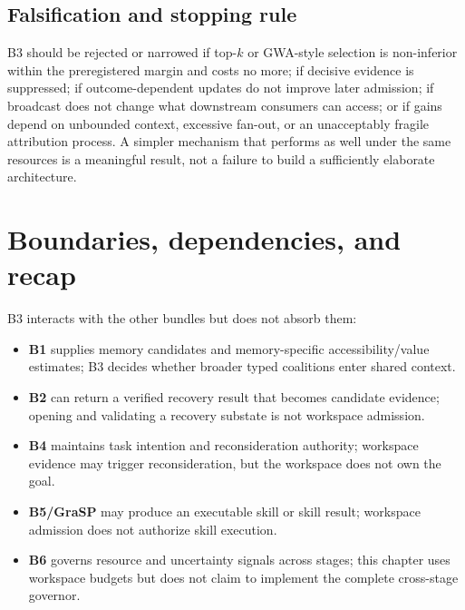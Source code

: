 
\subsection{Falsification and stopping rule}

B3 should be rejected or narrowed if top-$k$ or GWA-style selection is non-inferior within the preregistered margin and costs no more; if decisive evidence is suppressed; if outcome-dependent updates do not improve later admission; if broadcast does not change what downstream consumers can access; or if gains depend on unbounded context, excessive fan-out, or an unacceptably fragile attribution process. A simpler mechanism that performs as well under the same resources is a meaningful result, not a failure to build a sufficiently elaborate architecture.

\section{Boundaries, dependencies, and recap}
\label{sec:ch14-boundaries}

B3 interacts with the other bundles but does not absorb them:
\begin{itemize}
  \item \textbf{B1} supplies memory candidates and memory-specific accessibility/value estimates; B3 decides whether broader typed coalitions enter shared context.
  \item \textbf{B2} can return a verified recovery result that becomes candidate evidence; opening and validating a recovery substate is not workspace admission.
  \item \textbf{B4} maintains task intention and reconsideration authority; workspace evidence may trigger reconsideration, but the workspace does not own the goal.
  \item \textbf{B5/GraSP} may produce an executable skill or skill result; workspace admission does not authorize skill execution.
  \item \textbf{B6} governs resource and uncertainty signals across stages; this chapter uses workspace budgets but does not claim to implement the complete cross-stage governor.
\end{itemize}

